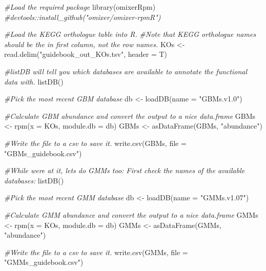 \documentclass[
]{article}
\newenvironment{Shaded}{\begin{snugshade}}{\end{snugshade}}
\newcommand{\AttributeTok}[1]{\textcolor[rgb]{0.77,0.63,0.00}{#1}}
\newcommand{\CommentTok}[1]{\textcolor[rgb]{0.56,0.35,0.01}{\textit{#1}}}
\newcommand{\FunctionTok}[1]{\textcolor[rgb]{0.00,0.00,0.00}{#1}}
\newcommand{\NormalTok}[1]{#1}
\newcommand{\OtherTok}[1]{\textcolor[rgb]{0.56,0.35,0.01}{#1}}
\newcommand{\StringTok}[1]{\textcolor[rgb]{0.31,0.60,0.02}{#1}}
\begin{document}
\begin{Shaded}
\begin{Highlighting}[]
\CommentTok{\#Load the required package}
\FunctionTok{library}\NormalTok{(omixerRpm) }\CommentTok{\#devtools::install\_github("omixer/omixer{-}rpmR")}

\CommentTok{\#Load the KEGG orthologue table into R. }
\CommentTok{\#Note that KEGG orthologue names should be the in first column, not the row names.  }
\NormalTok{KOs }\OtherTok{\textless{}{-}} \FunctionTok{read.delim}\NormalTok{(}\StringTok{"guidebook\_out\_KOs.tsv"}\NormalTok{, }\AttributeTok{header =}\NormalTok{ T)}

\CommentTok{\#listDB will tell you which databases are available to annotate the functional data with. }
\FunctionTok{listDB}\NormalTok{()}

\CommentTok{\#Pick the most recent GBM database}
\NormalTok{db }\OtherTok{\textless{}{-}} \FunctionTok{loadDB}\NormalTok{(}\AttributeTok{name =} \StringTok{"GBMs.v1.0"}\NormalTok{)}

\CommentTok{\#Calculate GBM abundance and convert the output to a nice data.frame}
\NormalTok{GBMs }\OtherTok{\textless{}{-}} \FunctionTok{rpm}\NormalTok{(}\AttributeTok{x =}\NormalTok{ KOs,  }\AttributeTok{module.db =}\NormalTok{ db)}
\NormalTok{GBMs }\OtherTok{\textless{}{-}} \FunctionTok{asDataFrame}\NormalTok{(GBMs, }\StringTok{"abundance"}\NormalTok{)}

\CommentTok{\#Write the file to a csv to save it. }
\FunctionTok{write.csv}\NormalTok{(GBMs, }\AttributeTok{file =} \StringTok{"GBMs\_guidebook.csv"}\NormalTok{)}

\CommentTok{\#While we\textquotesingle{}re at it, let\textquotesingle{}s do GMMs too: First check the names of the available databases:}
\FunctionTok{listDB}\NormalTok{()}

\CommentTok{\#Pick the most recent GMM database}
\NormalTok{db }\OtherTok{\textless{}{-}} \FunctionTok{loadDB}\NormalTok{(}\AttributeTok{name =} \StringTok{"GMMs.v1.07"}\NormalTok{)}

\CommentTok{\#Calculate GMM abundance and convert the output to a nice data.frame}
\NormalTok{GMMs }\OtherTok{\textless{}{-}} \FunctionTok{rpm}\NormalTok{(}\AttributeTok{x =}\NormalTok{ KOs,  }\AttributeTok{module.db =}\NormalTok{ db)}
\NormalTok{GMMs }\OtherTok{\textless{}{-}} \FunctionTok{asDataFrame}\NormalTok{(GMMs, }\StringTok{"abundance"}\NormalTok{)}

\CommentTok{\#Write the file to a csv to save it. }
\FunctionTok{write.csv}\NormalTok{(GMMs, }\AttributeTok{file =} \StringTok{"GMMs\_guidebook.csv"}\NormalTok{)}
\end{Highlighting}
\end{Shaded}
\end{document}
